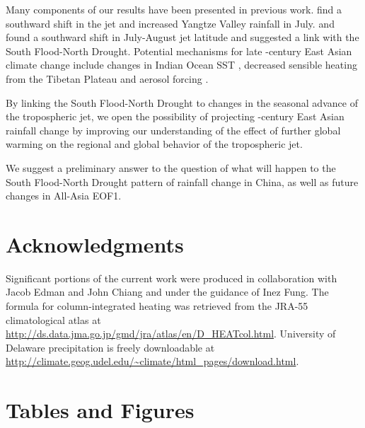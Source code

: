 	Many components of our results have been presented in previous work. \citet{Xuan2011} find a southward shift in the jet and increased Yangtze Valley rainfall in July. \citet{Yu2004} and \citet{Yu2007} found a southward shift in July-August jet latitude and suggested a link with the South Flood-North Drought. Potential mechanisms for late -century East Asian climate change include changes in Indian Ocean SST \citep{Qu2012}, decreased sensible heating from the Tibetan Plateau \citep{Liu2012a,Hu2015} and aerosol forcing \citep{Song2014}.
	
 By linking the South Flood-North Drought to changes in the seasonal advance of the tropospheric jet, we open the possibility of projecting -century East Asian rainfall change by improving our understanding of the effect of further global warming on the regional and global behavior of the tropospheric jet.
	
	
	We suggest a preliminary answer to the question of what will happen to the South Flood-North Drought pattern of rainfall change in China, as well as future changes in All-Asia EOF1.

	
\section{Acknowledgments}

	Significant portions of the current work were produced in collaboration with Jacob Edman and John Chiang and under the guidance of Inez Fung. The formula for column-integrated heating was retrieved from the JRA-55 climatological atlas at \url{http://ds.data.jma.go.jp/gmd/jra/atlas/en/D_HEATcol.html}. University of Delaware precipitation is freely downloadable at \url{http://climate.geog.udel.edu/~climate/html_pages/download.html}.


\newpage	
\section{Tables and Figures}


